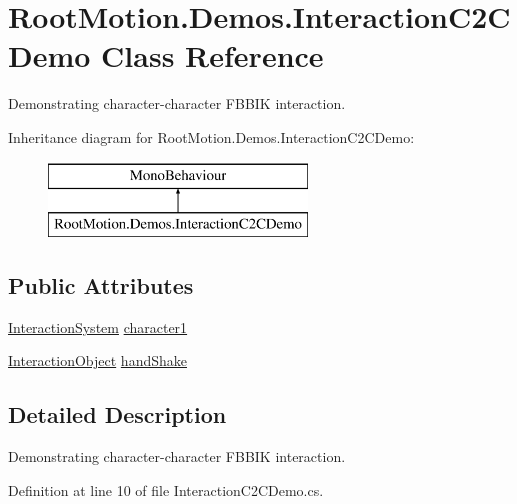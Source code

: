 \hypertarget{class_root_motion_1_1_demos_1_1_interaction_c2_c_demo}{}\section{Root\+Motion.\+Demos.\+Interaction\+C2\+C\+Demo Class Reference}
\label{class_root_motion_1_1_demos_1_1_interaction_c2_c_demo}


Demonstrating character-\/character F\+B\+B\+IK interaction.  


Inheritance diagram for Root\+Motion.\+Demos.\+Interaction\+C2\+C\+Demo\+:\begin{figure}[H]
\begin{center}
\leavevmode
\includegraphics[height=2.000000cm]{class_root_motion_1_1_demos_1_1_interaction_c2_c_demo}
\end{center}
\end{figure}
\subsection*{Public Attributes}
\begin{DoxyCompactItemize}
\item 
\mbox{\hyperlink{class_root_motion_1_1_final_i_k_1_1_interaction_system}{Interaction\+System}} \mbox{\hyperlink{class_root_motion_1_1_demos_1_1_interaction_c2_c_demo_ab13341213d4b77855842340d9fedaeda}{character1}}
\item 
\mbox{\hyperlink{class_root_motion_1_1_final_i_k_1_1_interaction_object}{Interaction\+Object}} \mbox{\hyperlink{class_root_motion_1_1_demos_1_1_interaction_c2_c_demo_aa7208fc073771f11774223a9c052ef9b}{hand\+Shake}}
\end{DoxyCompactItemize}


\subsection{Detailed Description}
Demonstrating character-\/character F\+B\+B\+IK interaction. 



Definition at line 10 of file Interaction\+C2\+C\+Demo.\+cs.



